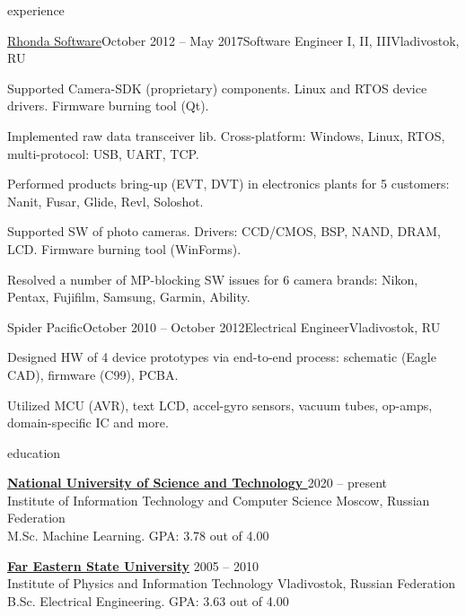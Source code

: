 \documentclass{template}
\begin{document}
\begin{rSection}{experience}
\begin{rCompany}{\href{http://www.rhondasoftware.com}{Rhonda Software}}{October 2012 -- May 2017}{Software Engineer I, II, III}{Vladivostok, RU}
\item Supported Camera-SDK (proprietary) components. Linux and RTOS device drivers. Firmware burning tool (Qt).
\item Implemented raw data transceiver lib. Cross-platform: Windows, Linux, RTOS, multi-protocol: USB, UART, TCP.
\item Performed products bring-up (EVT, DVT) in electronics plants for 5 customers: Nanit, Fusar, Glide, Revl, Soloshot.
\item Supported SW of photo cameras. Drivers: CCD/CMOS, BSP, NAND, DRAM, LCD. Firmware burning tool (WinForms).
\item Resolved a number of MP-blocking SW issues for 6 camera brands: Nikon, Pentax, Fujifilm, Samsung, Garmin, Ability.

\end{rCompany}
\begin{rCompany}{Spider Pacific}{October 2010 -- October 2012}{Electrical Engineer}{Vladivostok, RU}

\item Designed HW of 4 device prototypes via end-to-end process: schematic (Eagle CAD), firmware (C99), PCBA.
\item Utilized MCU (AVR), text LCD, accel-gyro sensors, vacuum tubes, op-amps, domain-specific IC and more.

\end{rCompany}
\end{rSection}

\begin{rSection}{education}

{\bf \href{https://en.misis.ru}{National University of Science and Technology }} \hfill {2020 -- present} \\
Institute of Information Technology and Computer Science \hfill {Moscow, Russian Federation} \\
M.Sc. Machine Learning. GPA: 3.78 out of 4.00

{\bf \href{https://www.dvfu.ru/en/}{Far Eastern State University}} \hfill {2005 -- 2010} \\
Institute of Physics and Information Technology \hfill {Vladivostok, Russian Federation} \\
B.Sc. Electrical Engineering. GPA: 3.63 out of 4.00

\end{rSection}
\end{document}
